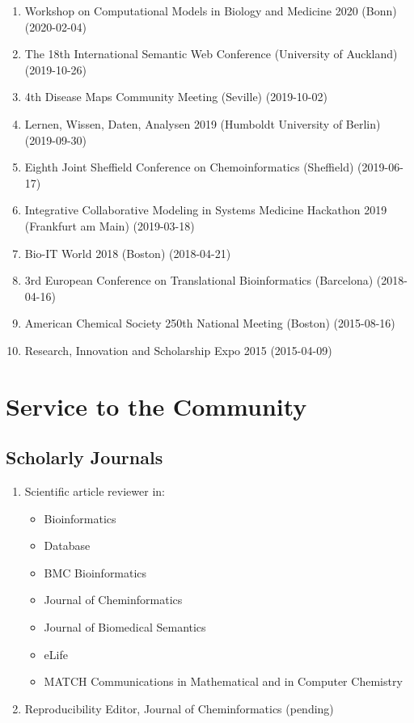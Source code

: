 \documentclass[10pt,a4paper,sans]{moderncv} %
\begin{document}
\begin{enumerate}
        \item     Workshop on Computational Models in Biology and Medicine 2020 (Bonn) (2020-02-04)

        \item     The 18th International Semantic Web Conference (University of Auckland) (2019-10-26)

        \item     4th Disease Maps Community Meeting (Seville) (2019-10-02)

        \item     Lernen, Wissen, Daten, Analysen 2019 (Humboldt University of Berlin) (2019-09-30)

        \item     Eighth Joint Sheffield Conference on Chemoinformatics (Sheffield) (2019-06-17)

        \item     Integrative Collaborative Modeling in Systems Medicine Hackathon 2019 (Frankfurt am Main) (2019-03-18)

        \item     Bio-IT World 2018 (Boston) (2018-04-21)

        \item     3rd European Conference on Translational Bioinformatics (Barcelona) (2018-04-16)

        \item     American Chemical Society 250th National Meeting (Boston) (2015-08-16)

        \item     Research, Innovation and Scholarship Expo 2015  (2015-04-09)

    \end{enumerate}

\section{Service to the Community}

\subsection{Scholarly Journals}

\begin{enumerate}
\item Scientific article reviewer in:
\begin{itemize}
    \item Bioinformatics
    \item Database
    \item BMC Bioinformatics
    \item Journal of Cheminformatics
    \item Journal of Biomedical Semantics
    \item eLife
    \item MATCH Communications in Mathematical and in Computer Chemistry
\end{itemize}
\item Reproducibility Editor, Journal of Cheminformatics (pending)
\end{enumerate}
\end{document}
